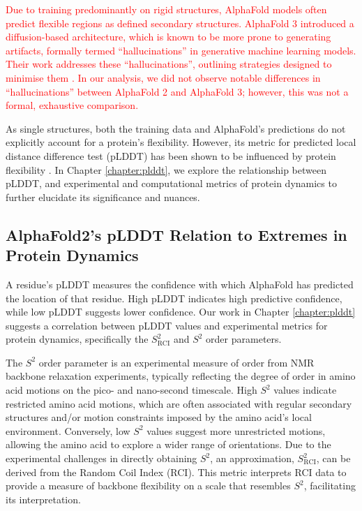 \textcolor{red}{Due to training predominantly on rigid structures, AlphaFold models often predict flexible regions as defined secondary structures. AlphaFold 3 introduced a diffusion-based architecture, which is known to be more prone to generating artifacts, formally termed ``hallucinations'' in generative machine learning models. Their work addresses these ``hallucinations'', outlining strategies designed to minimise them \cite{abramson_accurate_2024}. In our analysis, we did not observe notable differences in ``hallucinations'' between AlphaFold 2 and AlphaFold 3; however, this was not a formal, exhaustive comparison. }

As single structures, both the training data and AlphaFold's predictions do not explicitly account for a protein's flexibility. However, its metric for predicted local distance difference test (pLDDT) has been shown to be influenced by protein flexibility \cite{saldano_impact_2022}. In Chapter \ref{chapter:plddt}, we explore the relationship between pLDDT, and experimental and computational metrics of protein \gls{dynamics} to further elucidate its significance and nuances.


\subsection{AlphaFold2's pLDDT Relation to Extremes in Protein Dynamics}

A residue's pLDDT measures the confidence with which AlphaFold has predicted the location of that residue. High pLDDT indicates high predictive confidence, while low pLDDT suggests lower confidence. Our work in Chapter \ref{chapter:plddt} \cite{gavalda-garcia_gradations_2024} suggests a correlation between pLDDT values and experimental metrics for protein \gls{dynamics}, specifically the $S^{2}_{\text{RCI}}$ and $S^{2}$ order parameters.

The $S^{2}$ order parameter is an experimental measure of order from NMR backbone relaxation experiments, typically reflecting the degree of order in amino acid motions on the pico- and nano-second timescale. High $S^{2}$ values indicate restricted amino acid motions, which are often associated with regular secondary structures and/or motion constraints imposed by the amino acid's local environment. Conversely, low $S^{2}$ values suggest more unrestricted motions, allowing the amino acid to explore a wider range of orientations. Due to the experimental challenges in directly obtaining $S^{2}$, an approximation, $S^{2}_{\text{RCI}}$, can be derived from the Random Coil Index (RCI). This metric interprets RCI data to provide a measure of backbone flexibility on a scale that resembles $S^{2}$, facilitating its interpretation.

